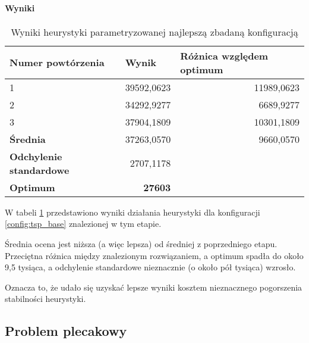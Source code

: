 \documentclass[./FM_mgr.tex]{subfiles}
\begin{document}
\paragraph{Wyniki}

\begin{table}[h]
	\caption{Wyniki heurystyki parametryzowanej najlepszą zbadaną konfiguracją \label{table:tsp_tweak_results}}
	\centering
	\begin{tabular}{|l|r|r}
		\hline
		{\bf Numer powtórzenia}      & \multicolumn{1}{l|}{{\bf Wynik}} & \multicolumn{1}{l|}{{\bf Różnica względem optimum}} \\ \hline \hline
		1                            & 39592,0623                       & \multicolumn{1}{r|}{11989,0623}                     \\ \hline
		2                            & 34292,9277                       & \multicolumn{1}{r|}{6689,9277}                      \\ \hline
		3                            & 37904,1809                       & \multicolumn{1}{r|}{10301,1809}                     \\ \hline \hline
		{\bf Średnia}                & 37263,0570                       & \multicolumn{1}{r|}{9660,0570}                      \\ \hline
		{\bf Odchylenie standardowe} & 2707,1178                        &                                                     \\ \hhline{==~}
		{\bf Optimum}                & {\bf 27603}                      &                                                     \\ \cline{1-2}
	\end{tabular}
\end{table}

W tabeli \ref{table:tsp_tweak_results} przedstawiono wyniki działania heurystyki dla konfiguracji \ref{config:tsp_base} znalezionej w tym etapie.

Średnia ocena jest niższa (a więc lepsza) od średniej z poprzedniego etapu.
Przeciętna różnica między znalezionym rozwiązaniem, a optimum spadła do około 9,5 tysiąca, a odchylenie standardowe nieznacznie (o około pół tysiąca) wzrosło.

Oznacza to, że udało się uzyskać lepsze wyniki kosztem nieznacznego pogorszenia stabilności heurystyki.

\subsection{Problem plecakowy}
\end{document}

